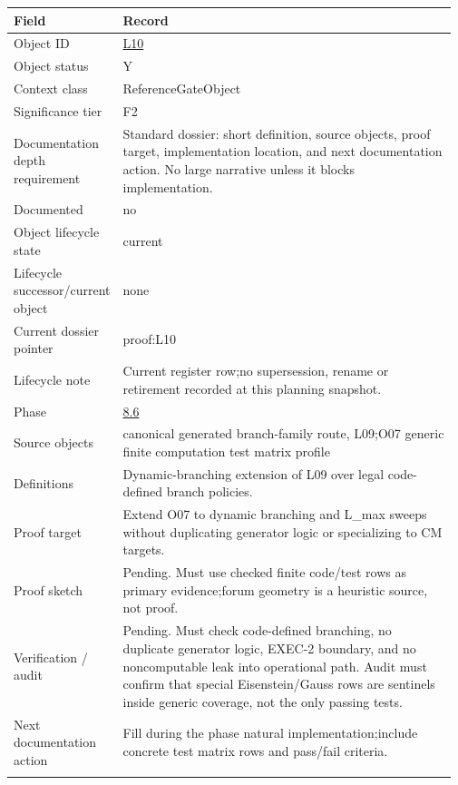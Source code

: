 \begin{longtable}{L{0.16\linewidth} L{0.81\linewidth}}
\hline
\textbf{Field} & \textbf{Record}\\
\hline
Object ID & \hyperlink{object-row-L10}{L10}\\
\hline\addlinespace[0.20em]
Object status & Y\\
\hline\addlinespace[0.20em]
Context class & ReferenceGateObject\\
\hline\addlinespace[0.20em]
Significance tier & F2\\
\hline\addlinespace[0.20em]
Documentation depth requirement & Standard dossier: short definition, source objects, proof target, implementation location, and next documentation action. No large narrative unless it blocks implementation.\\
\hline\addlinespace[0.20em]
Documented & no\\
\hline\addlinespace[0.20em]
Object lifecycle state & current\\
\hline\addlinespace[0.20em]
Lifecycle successor/\allowbreak{}current object & none\\
\hline\addlinespace[0.20em]
Current dossier pointer & proof:L10\\
\hline\addlinespace[0.20em]
Lifecycle note & Current register row;\newline no supersession, rename or retirement recorded at this planning snapshot.\\
\hline\addlinespace[0.20em]
Phase & \hyperlink{phase-row-8-6}{8.6}\\
\hline\addlinespace[0.20em]
Source objects & canonical generated branch-family route, L09;\newline O07 generic finite computation test matrix profile\\
\hline\addlinespace[0.20em]
Definitions & Dynamic-branching extension of L09 over legal code-defined branch policies.\\
\hline\addlinespace[0.20em]
Proof target & Extend O07 to dynamic branching and L\_max sweeps without duplicating generator logic or specializing to CM targets.\\
\hline\addlinespace[0.20em]
Proof sketch & Pending. Must use checked finite code/\allowbreak{}test rows as primary evidence;\newline forum geometry is a heuristic source, not proof.\\
\hline\addlinespace[0.20em]
Verification /\allowbreak{} audit & Pending. Must check code-defined branching, no duplicate generator logic, EXEC-2 boundary, and no noncomputable leak into operational path. Audit must confirm that special Eisenstein/\allowbreak{}Gauss rows are sentinels inside generic coverage, not the only passing tests.\\
\hline\addlinespace[0.20em]
Next documentation action & Fill during the phase natural implementation;\newline include concrete test matrix rows and pass/\allowbreak{}fail criteria.\\
\hline\addlinespace[0.20em]
\end{longtable}

